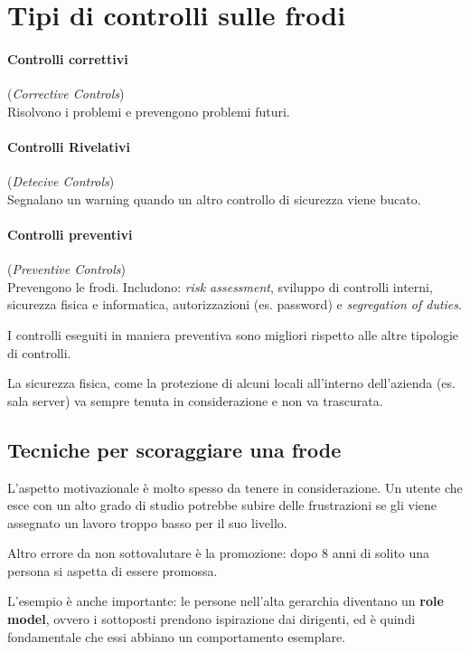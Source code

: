 \section{Tipi di controlli sulle frodi}


\paragraph*{Controlli correttivi} (\textit{Corrective Controls})\\
Risolvono i problemi e prevengono problemi futuri.

\paragraph*{Controlli Rivelativi} (\textit{Detecive Controls})\\
Segnalano un warning quando un altro controllo di sicurezza viene bucato.

\paragraph*{Controlli preventivi} (\textit{Preventive Controls})\\
Prevengono le frodi. Includono: \textit{risk assessment}, sviluppo di controlli
interni, sicurezza fisica e informatica, autorizzazioni (es. password) e
\textit{segregation of duties}.

I controlli eseguiti in maniera preventiva sono migliori rispetto alle
altre tipologie di controlli.

La sicurezza fisica, come la protezione di alcuni locali all'interno
dell'azienda (es. sala server) va sempre tenuta in
considerazione e non va trascurata.

\subsection{Tecniche per scoraggiare una frode}

L'aspetto motivazionale è molto spesso da tenere in considerazione.
Un utente che esce con un alto grado di studio potrebbe subire delle
frustrazioni se gli viene assegnato un lavoro troppo basso per il suo livello.

Altro errore da non sottovalutare è la promozione: dopo 8 anni di solito una
persona si aspetta di essere promossa.

L'esempio è anche importante: le persone nell'alta gerarchia diventano un
\textbf{role model}, ovvero i sottoposti prendono ispirazione dai dirigenti, ed
è quindi fondamentale che essi abbiano un comportamento esemplare.

